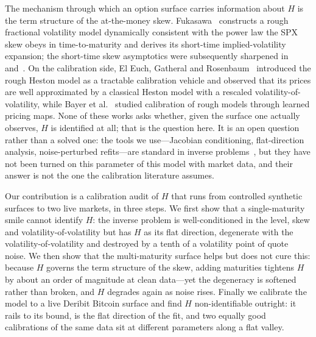 \documentclass[namedate,webpdf]{ima-authoring-template}
\numberwithin{equation}{section}
\begin{document}
The mechanism through which an option surface carries information about $H$ is the term
structure of the at-the-money skew. Fukasawa~\citeyearpar{fukasawa2017} constructs a rough
fractional volatility model dynamically consistent with the power law the SPX skew obeys
in time-to-maturity and derives its short-time implied-volatility expansion; the
short-time skew asymptotics were subsequently sharpened in~\citet{bfghs2019} and~\citet{efgr2019}. On
the calibration side, El Euch, Gatheral and Rosenbaum~\citeyearpar{egr2019} introduced the rough
Heston model as a tractable calibration vehicle and observed that its prices are well
approximated by a classical Heston model with a rescaled volatility-of-volatility, while
Bayer et al.~\citeyearpar{bhmst2019} studied calibration of rough models through learned pricing
maps. None of these works asks whether, given the surface one actually observes, $H$ is
identified at all; that is the question here. It is an open question rather than a solved
one: the tools we use---Jacobian conditioning, flat-direction analysis, noise-perturbed
refits---are standard in inverse problems~\citep{tms2010}, but they have not been turned on this parameter
of this model with market data, and their answer is not the one the calibration literature
assumes.

Our contribution is a calibration audit of $H$ that runs from controlled synthetic surfaces to two
live markets, in three steps. We first show that a single-maturity smile cannot identify $H$: the
inverse problem is well-conditioned in the level, skew and volatility-of-volatility but has $H$ as
its flat direction, degenerate with the volatility-of-volatility and destroyed by a tenth of a
volatility point of quote noise. We then show that the multi-maturity surface helps but does not
cure this: because $H$ governs the term structure of the skew, adding maturities tightens $H$ by
about an order of magnitude at clean data---yet the degeneracy is softened rather than broken, and
$H$ degrades again as noise rises. Finally we calibrate the model to a live Deribit Bitcoin surface
and find $H$ non-identifiable outright: it rails to its bound, is the flat direction
of the fit, and two equally good calibrations of the same data sit at different parameters along a
flat valley.
\end{document}
